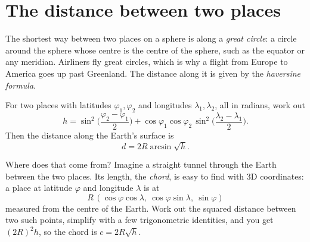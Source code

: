 \section{The distance between two places}

The shortest way between two places on a sphere is along a
\emph{great circle}: a circle around the sphere whose centre is the centre
of the sphere, such as the equator or any meridian. Airliners fly great
circles, which is why a flight from Europe to America goes up past
Greenland. The distance along it is given by the \emph{haversine formula}.

\begin{mathbox}
For two places with latitudes $\varphi_1, \varphi_2$ and longitudes
$\lambda_1, \lambda_2$, all in radians, work out
\[
  h = \sin^2\!\Big(\frac{\varphi_2 - \varphi_1}{2}\Big)
    + \cos\varphi_1 \cos\varphi_2 \, \sin^2\!\Big(\frac{\lambda_2 - \lambda_1}{2}\Big).
\]
Then the distance along the Earth's surface is
\[
  d = 2R \arcsin\sqrt{h}.
\]
\end{mathbox}

Where does that come from? Imagine a straight tunnel through the Earth
between the two places. Its length, the \emph{chord}, is easy to find with
3D coordinates: a place at latitude $\varphi$ and longitude $\lambda$ is at
\[
  R\,(\cos\varphi\cos\lambda,\ \cos\varphi\sin\lambda,\ \sin\varphi)
\]
measured from the centre of the Earth. Work out the squared distance
between two such points, simplify with a few trigonometric identities, and
you get $(2R)^2 h$, so the chord is $c = 2R\sqrt{h}$.

\begin{center}
\end{center}

